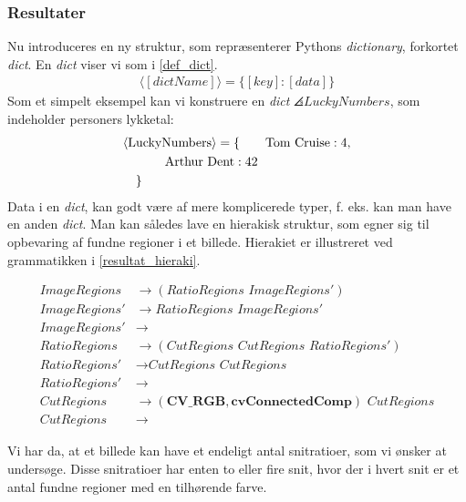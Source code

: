 {\subsubsection{Resultater}
Nu introduceres en ny struktur, som repræsenterer Pythons
\emph{dictionary}, forkortet \emph{dict}.  En \emph{dict} viser vi som i
\ref{def_dict}.
\begin{eqnarray}
    \langle[\textit{dictName}]\rangle = \{ [\textit{key}] : [\textit{data}] \}
    \label{def_dict}
\end{eqnarray}
Som et simpelt eksempel kan vi konstruere en \emph{dict}
$\angles{LuckyNumbers}$, som indeholder personers lykketal:
\begin{multline}
    \angles{LuckyNumbers} = \{ \qquad \textrm{Tom Cruise} : 4 , \\
    \textrm{Arthur Dent} : 42 \qquad\qquad\\
    \shoveleft{\}}\shoveright{}
    \label{lucky_dict}
\end{multline}
Data i en \emph{dict}, kan godt være af mere komplicerede typer, f. eks.
kan man have en anden \emph{dict}. Man kan således lave en hierakisk
struktur, som egner sig til opbevaring af fundne regioner i et billede.
Hierakiet er illustreret ved grammatikken i
\eqref{resultat_hieraki}.

\begin{equation}
    \begin{split}
        \textit{ImageRegions}  & \to  (\textit{RatioRegions~ImageRegions}')\\
        \textit{ImageRegions}' & \to  \textit{RatioRegions~ImageRegions}'\\
        \textit{ImageRegions}' & \to  \\
        \textit{RatioRegions}  & \to  (\textit{CutRegions~CutRegions~RatioRegions}')\\
        \textit{RatioRegions}' & \to  \textit{CutRegions~CutRegions}\\
        \textit{RatioRegions}' & \to  \\
        \textit{CutRegions}    & \to  (\textbf{CV\_RGB}, \textbf{cvConnectedComp})\textit{~CutRegions} \\
        \textit{CutRegions}    & \to
    \end{split}
    \label{resultat_hieraki}
\end{equation}

Vi har da, at et billede kan have et endeligt antal snitratioer, som vi
ønsker at undersøge. Disse snitratioer har enten to eller fire snit,
hvor der i hvert snit er et antal fundne regioner med en tilhørende
farve.

}
